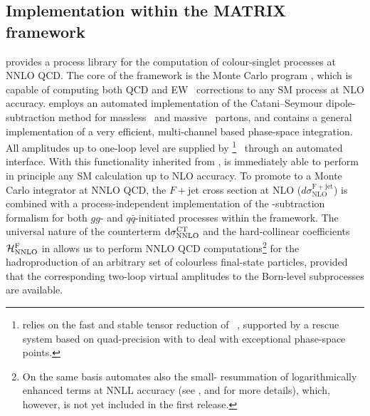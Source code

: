 \documentclass[english,11pt]{article}
\begin{document}
\subsection[Implementation within the M{\scriptsize ATRIX} framework]{Implementation within the M{\small ATRIX} framework}
\label{subsec:matrix}

\Matrix{} provides a process library for the computation of colour-singlet processes at NNLO QCD. 
The core of the \Matrix{} framework is the Monte Carlo program \Munich{}, which is 
capable of computing both QCD and EW~\cite{Kallweit:2014xda,Kallweit:2015dum} corrections to any SM process at NLO accuracy.
\Munich{} employs an automated implementation of the Catani--Seymour dipole-subtraction method for massless~\cite{Catani:1996jh,Catani:1996vz}
and massive~\cite{Catani:2002hc} partons, and contains a general implementation of a very efficient, multi-channel based  phase-space integration.
All amplitudes up to one-loop level are supplied by \OpenLoops{}\footnote{\OpenLoops{} relies on the fast and stable tensor reduction
 of \Collier{}~\cite{Denner:2014gla,Denner:2016kdg}, supported by a rescue system based on 
quad-precision \CutTools\cite{Ossola:2007ax} with \OneLOop\cite{vanHameren:2010cp} to deal with exceptional phase-space points.}~\cite{Cascioli:2011va} through an automated interface. 
With this functionality inherited from \Munich{}, \Matrix{} is immediately able to perform in principle any SM calculation up to NLO accuracy.
To promote \Munich{} to a Monte Carlo integrator at NNLO QCD, the $F+$jet cross section at NLO ($d{\sigma}^{\mathrm{F + jet}}_{\mathrm{NLO}}$) is combined
with a process-independent implementation of the \qt{}-subtraction formalism for both $gg$- and $q{\bar q}$-initiated processes
within the \Matrix{} framework. The universal nature of the counterterm
$\mathrm{d}{\sigma}^{\mathrm{CT}}_{\mathrm{NNLO}}$ and the hard-collinear coefficients  
${\cal H}^{\mathrm{F}}_{\mathrm{NNLO}}$ in  allows us to perform NNLO QCD 
computations\footnote{On the same basis \Matrix{} automates also the small-\qt{} 
resummation of logarithmically enhanced terms at NNLL
accuracy (see , and  for more details), which, however, is not yet included in the first release.} 
for the hadroproduction of an arbitrary set of colourless final-state particles,
provided that the corresponding two-loop virtual amplitudes to the Born-level subprocesses are available. 
\end{document}
